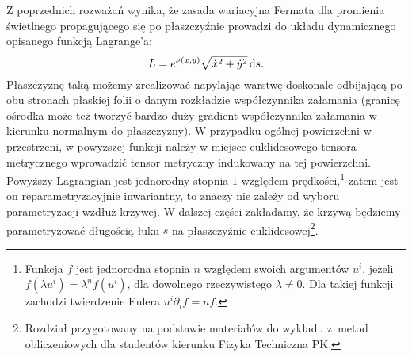 \indent Z poprzednich rozważań wynika, że zasada wariacyjna Fermata dla promienia świetlnego propagującego się po płaszczyźnie prowadzi do układu dynamicznego opisanego funkcją Lagrange'a:%
\begin{equation}\label{eq:lagrangian_ds}L=e^{\nu(x,y)}\sqrt{\dot{x}^{2}+\dot{y}^{2}}\,{\rm d}{s}.\end{equation}
Płaszczyznę taką możemy zrealizować napylając warstwę doskonale odbijającą po obu stronach płaskiej folii o danym rozkładzie współczynnika załamania (granicę ośrodka może też tworzyć bardzo duży gradient współczynnika załamania w kierunku normalnym do płaszczyzny). W przypadku ogólnej powierzchni w przestrzeni, w powyższej funkcji należy w miejsce euklidesowego tensora metrycznego wprowadzić tensor metryczny indukowany na tej powierzchni.
%
Powyższy Lagrangian jest jednorodny stopnia $1$ względem prędkości,\footnote{Funkcja $f$ jest jednorodna stopnia $n$ względem swoich  argumentów $u^i$, jeżeli $f(\lambda u^i)=\lambda^n f(u^i)$, dla dowolnego rzeczywistego $\lambda\neq0$. Dla takiej funkcji zachodzi twierdzenie Eulera $u^i\partial_if=nf$.} zatem jest on reparametryzacyjnie inwariantny, to znaczy nie zależy od wyboru parametryzacji wzdłuż krzywej. W dalszej części zakładamy, że krzywą będziemy parametryzować długością łuku $s$ na płaszczyźnie euklidesowej\footnote{Rozdział przygotowany na podstawie materiałów do wykładu z~metod obliczeniowych dla studentów kierunku Fizyka Techniczna PK.}. 


